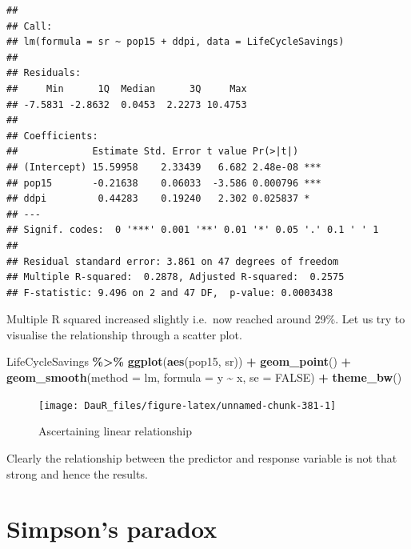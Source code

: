 \documentclass[
]{book}
\newenvironment{Shaded}{\begin{snugshade}}{\end{snugshade}}
\newcommand{\AttributeTok}[1]{\textcolor[rgb]{0.13,0.29,0.53}{#1}}
\newcommand{\ConstantTok}[1]{\textcolor[rgb]{0.56,0.35,0.01}{#1}}
\newcommand{\FunctionTok}[1]{\textcolor[rgb]{0.13,0.29,0.53}{\textbf{#1}}}
\newcommand{\NormalTok}[1]{#1}
\newcommand{\SpecialCharTok}[1]{\textcolor[rgb]{0.81,0.36,0.00}{\textbf{#1}}}
\newcommand{\StringTok}[1]{\textcolor[rgb]{0.31,0.60,0.02}{#1}}
\begin{document}
\begin{verbatim}
## 
## Call:
## lm(formula = sr ~ pop15 + ddpi, data = LifeCycleSavings)
## 
## Residuals:
##     Min      1Q  Median      3Q     Max 
## -7.5831 -2.8632  0.0453  2.2273 10.4753 
## 
## Coefficients:
##             Estimate Std. Error t value Pr(>|t|)    
## (Intercept) 15.59958    2.33439   6.682 2.48e-08 ***
## pop15       -0.21638    0.06033  -3.586 0.000796 ***
## ddpi         0.44283    0.19240   2.302 0.025837 *  
## ---
## Signif. codes:  0 '***' 0.001 '**' 0.01 '*' 0.05 '.' 0.1 ' ' 1
## 
## Residual standard error: 3.861 on 47 degrees of freedom
## Multiple R-squared:  0.2878, Adjusted R-squared:  0.2575 
## F-statistic: 9.496 on 2 and 47 DF,  p-value: 0.0003438
\end{verbatim}

Multiple R squared increased slightly i.e.~now reached around 29\%. Let us try to visualise the relationship through a scatter plot.

\begin{Shaded}
\begin{Highlighting}[]
\NormalTok{LifeCycleSavings }\SpecialCharTok{\%\textgreater{}\%} 
  \FunctionTok{ggplot}\NormalTok{(}\FunctionTok{aes}\NormalTok{(pop15, sr)) }\SpecialCharTok{+}
  \FunctionTok{geom\_point}\NormalTok{() }\SpecialCharTok{+}
  \FunctionTok{geom\_smooth}\NormalTok{(}\AttributeTok{method =} \StringTok{\textquotesingle{}lm\textquotesingle{}}\NormalTok{, }\AttributeTok{formula =} \StringTok{\textquotesingle{}y \textasciitilde{} x\textquotesingle{}}\NormalTok{, }\AttributeTok{se =} \ConstantTok{FALSE}\NormalTok{) }\SpecialCharTok{+}
  \FunctionTok{theme\_bw}\NormalTok{()}
\end{Highlighting}
\end{Shaded}

\begin{figure}

{\centering \texttt{[image: DauR\_files/figure-latex/unnamed-chunk-381-1]} 

}

\caption{Ascertaining linear relationship}\label{fig:unnamed-chunk-381}
\end{figure}

Clearly the relationship between the predictor and response variable is not that strong and hence the results.

\hypertarget{simpsons-paradox}{%
\section{Simpson's paradox}\label{simpsons-paradox}}
\end{document}

